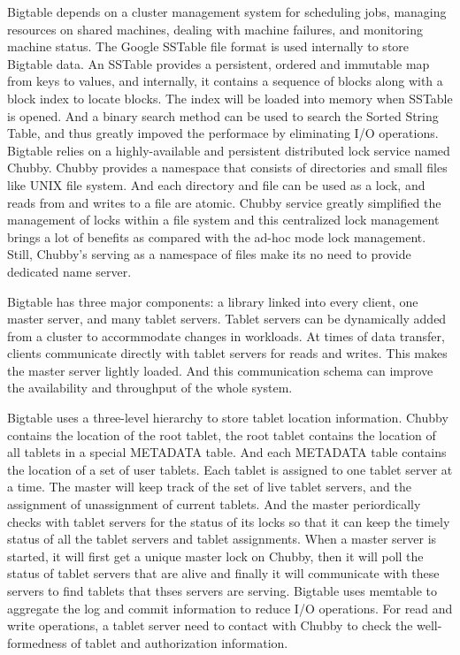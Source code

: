 \documentclass[a4paper]{article}
\begin{document}
Bigtable depends on a cluster management system for scheduling jobs,
managing resources on shared machines, dealing with machine failures,
and monitoring machine status. The Google SSTable file format is used
internally to store Bigtable data. An SSTable provides a persistent,
ordered and immutable map from keys to values, and internally, it
contains a sequence of blocks along with a block index to locate
blocks. The index will be loaded into memory when SSTable is
opened. And a binary search method can be used to search the Sorted
String Table, and thus greatly impoved the performace by eliminating
I/O operations. Bigtable relies on a highly-available and persistent
distributed lock service named Chubby. Chubby provides a namespace
that consists of directories and small files like UNIX file
system. And each directory and file can be used as a lock, and reads
from and writes to a file are atomic. Chubby service greatly
simplified the management of locks within a file system and this
centralized lock management brings a lot of benefits as compared with
the ad-hoc mode lock management. Still, Chubby's serving as a
namespace of files make its no need to provide dedicated name server.

Bigtable has three major components: a library linked
into every client, one master server, and many tablet servers. Tablet
servers can be dynamically added from a cluster to accormmodate
changes in workloads. At times of data transfer, clients communicate
directly with tablet servers for reads and writes. This makes the
master server lightly loaded. And this communication schema can
improve the availability and throughput of the whole system. 

Bigtable uses a three-level hierarchy to store tablet location
information. Chubby contains the location of the root tablet, the root
tablet contains the location of all tablets in a special METADATA
table. And each METADATA table contains the location of a set of user
tablets. Each tablet is assigned to one tablet server at a time. The
master will keep track of the set of live tablet servers, and the
assignment of unassignment of current tablets. And the master
periordically checks with tablet servers for the status of its locks
so that it can keep the timely status of all the tablet servers and
tablet assignments. When a master server is started, it will first get
a unique master lock on Chubby, then it will poll the status of tablet
servers that are alive and finally it will communicate with these
servers to find tablets that thses servers are serving.  Bigtable uses
memtable to aggregate the log and commit information to reduce I/O
operations. For read and write operations, a tablet server need to
contact with Chubby to check the well-formedness of tablet and
authorization information. 
\end{document}
